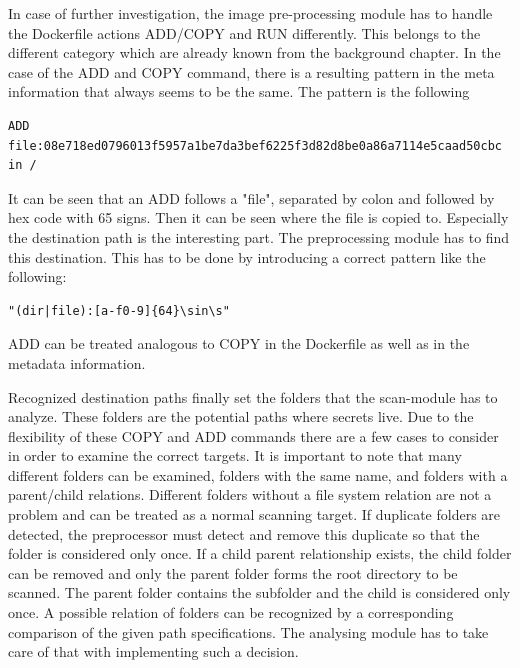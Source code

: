 In case of further investigation, the image pre-processing module has to handle the Dockerfile actions ADD/COPY and RUN differently.
This belongs to the different category which are already known from the background chapter.
In the case of the ADD and COPY command, there is a resulting pattern in the meta information that always seems to be the same.
The pattern is the following
\begin{lstlisting}
ADD file:08e718ed0796013f5957a1be7da3bef6225f3d82d8be0a86a7114e5caad50cbc in /
\end{lstlisting}
It can be seen that an ADD follows a "file", separated by colon and followed by hex code with 65 signs. Then it can be seen where the file is copied to.
Especially the destination path is the interesting part. The preprocessing module has to find this destination. This has to be done by introducing a correct pattern like the following:
\begin{lstlisting}
"(dir|file):[a-f0-9]{64}\sin\s"
\end{lstlisting}
ADD can be treated analogous to COPY in the Dockerfile as well as in the metadata information.

Recognized destination paths finally set the folders that the scan-module has to analyze. These folders are the potential paths where secrets live.
Due to the flexibility of these COPY and ADD commands there are a few cases to consider in order to examine the correct targets.
It is important to note that many different folders can be examined, folders with the same name, and folders with a parent/child relations.
Different folders without a file system relation are not a problem and can be treated as a normal scanning target. 
If duplicate folders are detected, the preprocessor must detect and remove this duplicate so that the folder is considered only once.
If a child parent relationship exists, the child folder can be removed and only the parent folder forms the root directory to be scanned. The parent folder contains the subfolder and the child is considered only once.
A possible relation of folders can be recognized by a corresponding comparison of the given path specifications. The analysing module has to take care of that with implementing such a decision. 

